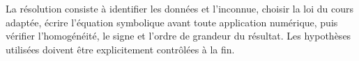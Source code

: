 \begin{corrigebox}[Corrigé]
La résolution consiste à identifier les données et l'inconnue, choisir la loi du cours adaptée, écrire l'équation symbolique avant toute application numérique, puis vérifier l'homogénéité, le signe et l'ordre de grandeur du résultat. Les hypothèses utilisées doivent être explicitement contrôlées à la fin.
\end{corrigebox}
